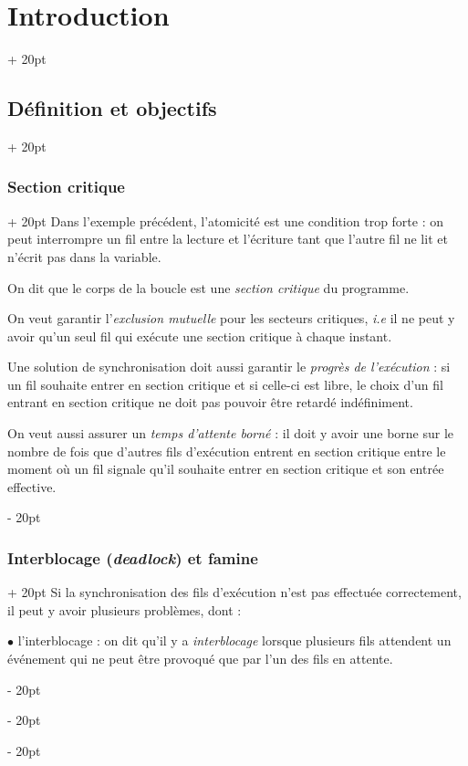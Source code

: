 \documentclass[a4paper, 12pt, twoside]{article}
\newcommand{\ind}[1][20pt]{\advance\leftskip + #1}
\newcommand{\deind}[1][20pt]{\advance\leftskip - #1}
\newenvironment{indt}[2][20pt]{#2 \par \ind[#1]}{\par \deind} %
\begin{document}
\begin{indt}{\section{Introduction}}
\begin{indt}{\subsection{Définition et objectifs}}
            \vspace{12pt}
            
            \begin{indt}{\subsubsection{Section critique}}
                Dans l'exemple précédent, l'atomicité est une condition trop forte : on peut interrompre un fil entre la lecture et l'écriture tant que l'autre fil ne lit et n'écrit pas dans la variable.

                On dit que le corps de la boucle est une \textit{\em section critique} du programme.

                On veut garantir l'\emph{\it exclusion mutuelle} pour les secteurs critiques, \textit{i.e} il ne peut y avoir qu'un seul fil qui exécute une section critique à chaque instant.

                Une solution de synchronisation doit aussi garantir le \emph{\it progrès de l'exécution} : si un fil souhaite entrer en section critique et si celle-ci est libre, le choix d'un fil entrant en section critique ne doit pas pouvoir être retardé indéfiniment.

                On veut aussi assurer un \emph{\it temps d'attente borné} : il doit y avoir une borne sur le nombre de fois que d'autres fils d'exécution entrent en section critique entre le moment où un fil signale qu'il souhaite entrer en section critique et son entrée effective.
            \end{indt}

            \vspace{12pt}
            
            \begin{indt}{\subsubsection{Interblocage (\textit{deadlock}) et famine}}
                Si la synchronisation des fils d'exécution n'est pas effectuée correctement, il peut y avoir plusieurs problèmes, dont :

                \vspace{12pt}
                
                $\bullet$ l'interblocage : on dit qu'il y a \textit{interblocage} lorsque plusieurs fils attendent un événement qui ne peut être provoqué que par l'un des fils en attente.


\end{indt}
\end{indt}
\end{indt}
\end{document}
